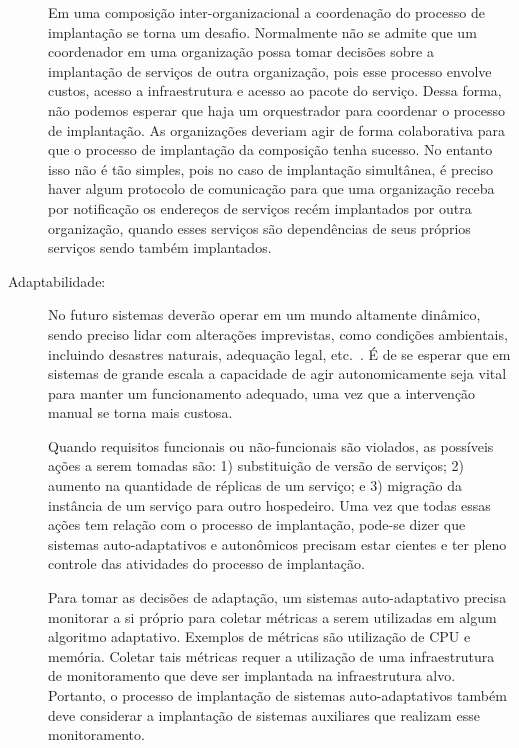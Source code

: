 \begin{description}
Em uma composição inter-organizacional a coordenação do processo de implantação se torna um desafio. Normalmente não se admite que um coordenador em uma organização possa tomar decisões 
sobre a implantação de serviços de outra organização, pois esse processo envolve
custos, acesso a infraestrutura e acesso ao pacote do serviço.
Dessa forma, não podemos esperar que haja um orquestrador para coordenar o processo de implantação.
As organizações deveriam agir de forma colaborativa para que o processo de implantação
da composição tenha sucesso.
No entanto isso não é tão simples, pois no caso de implantação simultânea,
é preciso haver algum protocolo de comunicação para que uma organização receba
por notificação os endereços de serviços recém implantados por outra organização,
quando esses serviços são dependências de seus próprios serviços sendo também implantados.

\item [Adaptabilidade:]

No futuro sistemas deverão operar em um mundo altamente dinâmico,
sendo preciso lidar com alterações imprevistas, como condições ambientais, incluindo desastres naturais, 
adequação legal, etc.~\cite{Papazoglou2008Journey}.
É de se esperar que em sistemas de grande escala a capacidade de agir autonomicamente 
seja vital para manter um funcionamento adequado, uma vez que a intervenção manual
se torna mais custosa.

Quando requisitos funcionais ou não-funcionais são violados, as possíveis ações a serem tomadas são:
1) substituição de versão de serviços; 2) aumento na quantidade de réplicas de um serviço; e
3) migração da instância de um serviço para outro hospedeiro.
Uma vez que todas essas ações tem relação com o processo de implantação,
pode-se dizer que sistemas auto-adaptativos e autonômicos precisam estar cientes
e ter pleno controle das atividades do processo de implantação.

Para tomar as decisões de adaptação, um sistemas auto-adaptativo precisa monitorar
a si próprio para coletar métricas a serem utilizadas em algum algoritmo adaptativo.
Exemplos de métricas são utilização de CPU e memória.
Coletar tais métricas requer a utilização de uma infraestrutura de monitoramento
que deve ser implantada na infraestrutura alvo.
Portanto, o processo de implantação de sistemas auto-adaptativos
também deve considerar a implantação de sistemas auxiliares que realizam esse monitoramento.


\end{description}



